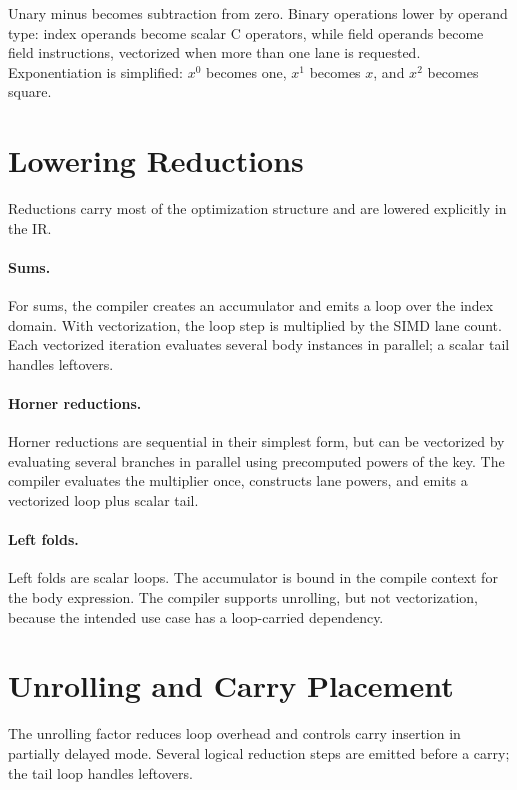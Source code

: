 Unary minus becomes subtraction from zero. Binary operations lower by operand type: index operands become scalar C operators, while field operands become field instructions, vectorized when more than one lane is requested. Exponentiation is simplified: \(x^0\) becomes one, \(x^1\) becomes \(x\), and \(x^2\) becomes square.

\section{Lowering Reductions}
\label{sec:lowering-reductions}

Reductions carry most of the optimization structure and are lowered explicitly in the IR.

\paragraph{Sums.}
For sums, the compiler creates an accumulator and emits a loop over the index domain. With vectorization, the loop step is multiplied by the SIMD lane count. Each vectorized iteration evaluates several body instances in parallel; a scalar tail handles leftovers.

\paragraph{Horner reductions.}
Horner reductions are sequential in their simplest form, but can be vectorized by evaluating several branches in parallel using precomputed powers of the key. The compiler evaluates the multiplier once, constructs lane powers, and emits a vectorized loop plus scalar tail.

\paragraph{Left folds.}
Left folds are scalar loops. The accumulator is bound in the compile context for the body expression. The compiler supports unrolling, but not vectorization, because the intended use case has a loop-carried dependency.

\section{Unrolling and Carry Placement}
\label{sec:unrolling-carry}

The unrolling factor reduces loop overhead and controls carry insertion in partially delayed mode. Several logical reduction steps are emitted before a carry; the tail loop handles leftovers.

